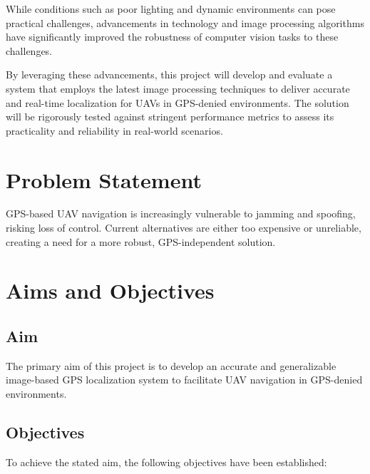 While conditions such as poor lighting and dynamic environments can pose practical challenges, advancements in technology and image processing algorithms have significantly improved the robustness of computer vision tasks to these challenges.

By leveraging these advancements, this project will develop and evaluate a system that employs the latest image processing techniques to deliver accurate and real-time localization for UAVs in GPS-denied environments. The solution will be rigorously tested against stringent performance metrics to assess its practicality and reliability in real-world scenarios.





\section{Problem Statement}
GPS-based UAV navigation is increasingly vulnerable to jamming and spoofing, risking loss of control. Current alternatives are either too expensive or unreliable, creating a need for a more robust, GPS-independent solution.

\section{Aims and Objectives}
\subsection{Aim}
The primary aim of this project is to develop an accurate and generalizable image-based GPS localization system to facilitate UAV navigation in GPS-denied environments.

\subsection{Objectives}
To achieve the stated aim, the following objectives have been established:


